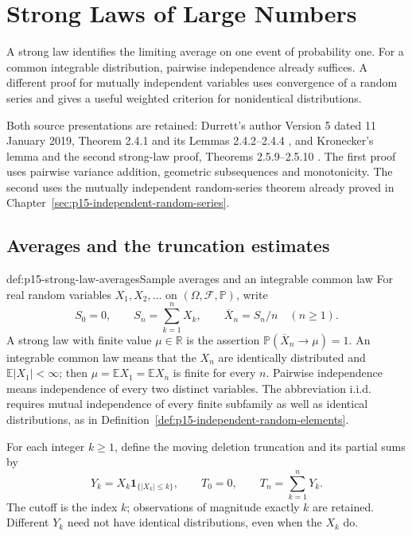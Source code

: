 \chapter{Strong Laws of Large Numbers}
\label{sec:p15-strong-laws-of-large-numbers}

A strong law identifies the limiting average on one event of probability
one. For a common integrable distribution, pairwise independence already
suffices. A different proof for mutually independent variables uses
convergence of a random series and gives a useful weighted criterion for
nonidentical distributions.

Both source presentations are retained: Durrett's author Version 5 dated
11 January 2019, Theorem 2.4.1 and its Lemmas 2.4.2--2.4.4
\cite[pp.~76--78]{DurrettPTEAuthor2019}, and Kronecker's lemma and
the second strong-law proof, Theorems 2.5.9--2.5.10
\cite[pp.~85--87]{DurrettPTEAuthor2019}. The first proof uses pairwise
variance addition, geometric subsequences and monotonicity. The second
uses the mutually independent random-series theorem already proved in
Chapter~\ref{sec:p15-independent-random-series}.

\section{Averages and the truncation estimates}
\label{sec:p15-strong-law-truncation}

\begin{hbdefinition}{def:p15-strong-law-averages}{Sample averages and an integrable common law}
For real random variables \(X_1,X_2,\ldots\) on
\((\Omega,\mathcal F,\mathbb P)\), write
\[
 S_0=0,\qquad S_n=\sum_{k=1}^nX_k,\qquad
 \overline X_n=S_n/n\quad(n\geq1).
\]
A strong law with finite value \(\mu\in\mathbb R\) is the
assertion \(\mathbb P(\overline X_n\to\mu)=1\).
An integrable common law means that the \(X_n\) are identically
distributed and \(\mathbb E|X_1|<\infty\); then
\(\mu=\mathbb EX_1=\mathbb EX_n\) is finite for every \(n\).
Pairwise independence means independence of every two distinct variables.
The abbreviation i.i.d. requires mutual independence of every finite
subfamily as well as identical distributions, as in
Definition~\ref{def:p15-independent-random-elements}.

For each integer \(k\geq1\), define the moving deletion truncation
and its partial sums by
\[
 Y_k=X_k\mathbf1_{\{|X_k|\leq k\}},\qquad
 T_0=0,\qquad T_n=\sum_{k=1}^nY_k.
\]
The cutoff is the index \(k\); observations of magnitude exactly
\(k\) are retained. Different \(Y_k\) need not have identical
distributions, even when the \(X_k\) do.
\end{hbdefinition}

